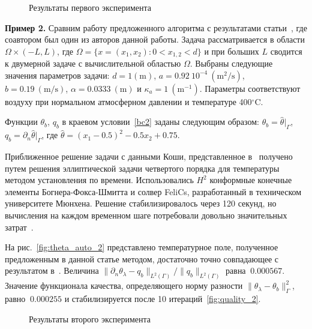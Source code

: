 \begin{figure}[H]
    \centering
    \caption{Результаты первого эксперимента}
\end{figure}

\textbf{Пример 2.}
Сравним работу предложенного алгоритма с результатами статьи~\cite{CNSNS19},
где соавтором был один из авторов данной работы.
Задача рассматривается в области $\Omega \times (-L,L)$,
где $\Omega = \{ x = (x_1,x_2) \colon 0 < x_{1,2} < d\}$
и при больших $L$ сводится к двумерной задаче с вычислительной областью $\Omega$.
Выбраны следующие значения параметров задачи:
$d = \mathrm{1(m)}$, $a = 0.92~10^{-4}~\mathrm{(m^2/s)}$, $b= 0.19~\mathrm{(m/s)}$,
$\alpha = 0.0333~\mathrm{(m)}$ и $\kappa_a = 1~\mathrm{(m^{-1})}$.
Параметры соответствуют воздуху при нормальном атмосферном давлении и температуре 400$^\circ$C\@.

Функции $\theta_b$, $q_b$ в краевом условии~\eqref{bc2} заданы следующим образом:
$\theta_b = \widehat{\theta}|_{\Gamma}$, $q_b = \partial_n \widehat{\theta}|_{\Gamma}$, где
$\widehat{\theta} = (x_1-0.5)^2 - 0.5x_2+0.75$.

Приближенное решение задачи с данными Коши, представленное в~\cite{CNSNS19}
получено путем решения эллиптической задачи четвертого
порядка для температуры методом установления по времени.
Использовались $H^2$ конформные конечные элементы Богнера-Фокса-Шмитта и
солвер FeliCs, разработанный в техническом университете Мюнхена.
Решение стабилизировалось через 120 секунд, но вычисления на каждом временном
шаге потребовали довольно значительных затрат~\cite{CNSNS19}.

На рис.~\ref{fig:theta_auto_2} представлено температурное поле, полученное
предложенным в данной статье методом, достаточно точно совпадающее с результатом в~\cite{CNSNS19}.
Величина $\|\partial_n\theta_\lambda-q_b\|_{L^2(\Gamma)}/\|q_b\|_{L^2(\Gamma)}$ равна $~0.000567$.
Значение функционала качества, определяющего норму разности $\|\theta_\lambda -\theta_b\|^2_\Gamma$,
равно $~0.000255$ и стабилизируется после 10 итераций~\ref{fig:quality_2}.

\begin{figure}[H]
    \centering
    \caption{Результаты второго эксперимента}
\end{figure}

